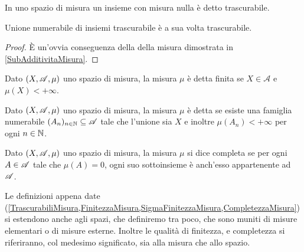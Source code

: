 \begin{definition}\label{TrascurabiliMisura}
	In uno spazio di misura un insieme con misura nulla è detto trascurabile.
\end{definition}
\begin{remark}\label{UnioneTrascurabili}
	Unione numerabile di insiemi trascurabile è a sua volta trascurabile.
\end{remark}
\begin{proof}
	È un'ovvia conseguenza della \sigsubadd[ità] della misura dimostrata in \cref{SubAdditivitaMisura}.
\end{proof}

\begin{definition}\label{FinitezzaMisura}
	Dato $(X,\mathscr A,\mu)$ uno spazio di misura, la misura $\mu$ è detta finita se $X\in\mathcal{A}$ e $\mu(X)<+\infty$.
\end{definition}

\begin{definition}\label{SigmaFinitezzaMisura}
	Dato $(X,\mathscr A,\mu)$ uno spazio di misura, la misura $\mu$ è detta \sigfin{} se esiste una famiglia numerabile $(A_n)_{n\in\mathbb N}\subseteq \mathscr A$ tale che l'unione sia $X$ e inoltre $\mu(A_n)<+\infty$ per ogni $n\in\mathbb N$.
\end{definition}

\begin{definition}\label{CompletezzaMisura}
	Dato $(X,\mathscr A,\mu)$ uno spazio di misura, la misura $\mu$ si dice completa se per ogni $A\in\mathscr A$ tale che $\mu(A)=0$, ogni suo sottoinsieme è anch'esso appartenente ad $\mathscr A$.
\end{definition}

\begin{remark}
	Le definizioni appena date (\cref{TrascurabiliMisura,FinitezzaMisura,SigmaFinitezzaMisura,CompletezzaMisura}) si estendono anche agli spazi, che definiremo tra poco, che sono muniti di misure elementari o di misure esterne. Inoltre le qualità di finitezza, \sigfin[ezza] e completezza si riferiranno, col medesimo significato, sia alla misura che allo spazio. 
\end{remark}

